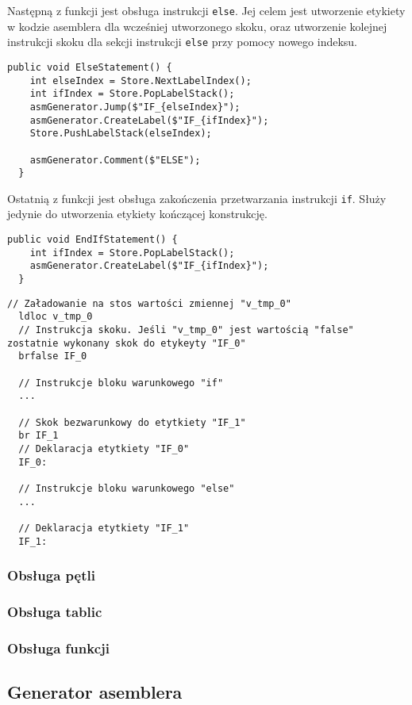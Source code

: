 \par Następną z funkcji jest obsługa instrukcji \texttt{else}. Jej celem jest utworzenie etykiety w kodzie asemblera dla wcześniej utworzonego skoku, oraz utworzenie kolejnej instrukcji skoku dla sekcji instrukcji \texttt{else} przy pomocy nowego indeksu. 

\begin{lstlisting}[language=CSharp, caption={Implementacja funkcji obsługująca sekcje \texttt{else} instrukcji \texttt{if}}, label=alg:if4]
  public void ElseStatement() {
    int elseIndex = Store.NextLabelIndex();
    int ifIndex = Store.PopLabelStack();
    asmGenerator.Jump($"IF_{elseIndex}");
    asmGenerator.CreateLabel($"IF_{ifIndex}");
    Store.PushLabelStack(elseIndex);

    asmGenerator.Comment($"ELSE");
  }
\end{lstlisting}

\par Ostatnią z funkcji jest obsługa zakończenia przetwarzania instrukcji \texttt{if}. Służy jedynie do utworzenia etykiety kończącej konstrukcję.

\begin{lstlisting}[language=CSharp, caption={Implementacja funkcji wywoływanej przy zakończeniu analizy instrukcji \texttt{if}}, label=alg:if5]
  public void EndIfStatement() {
    int ifIndex = Store.PopLabelStack();
    asmGenerator.CreateLabel($"IF_{ifIndex}");
  }
\end{lstlisting}

\begin{lstlisting}[language=IL, caption={Kod assemblera przedstawiający konstrukcję \texttt{if ... else}}, label=alg:if6]
  // Załadowanie na stos wartości zmiennej "v_tmp_0"
  ldloc v_tmp_0
  // Instrukcja skoku. Jeśli "v_tmp_0" jest wartością "false" zostatnie wykonany skok do etykeyty "IF_0"
  brfalse IF_0

  // Instrukcje bloku warunkowego "if"
  ...

  // Skok bezwarunkowy do etytkiety "IF_1"
  br IF_1
  // Deklaracja etytkiety "IF_0"
  IF_0: 

  // Instrukcje bloku warunkowego "else"
  ...

  // Deklaracja etytkiety "IF_1"
  IF_1: 
\end{lstlisting}


\subsubsection{Obsługa pętli}
\subsubsection{Obsługa tablic}
\subsubsection{Obsługa funkcji}

\subsection{Generator asemblera}
